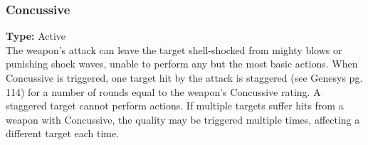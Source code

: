 \subsubsection{Concussive}
\label{iqty:concussive}
\textbf{Type:} Active\\
The weapon’s attack can leave the target shell-shocked
from mighty blows or punishing shock waves, unable
to perform any but the most basic actions. When Concussive
is triggered, one target hit by the attack is staggered
(see Genesys pg. 114) for a number of rounds equal to
the weapon’s Concussive rating. A staggered target cannot
perform actions. If multiple targets suffer hits from
a weapon with Concussive, the quality may be triggered
multiple times, affecting a different target each time.
